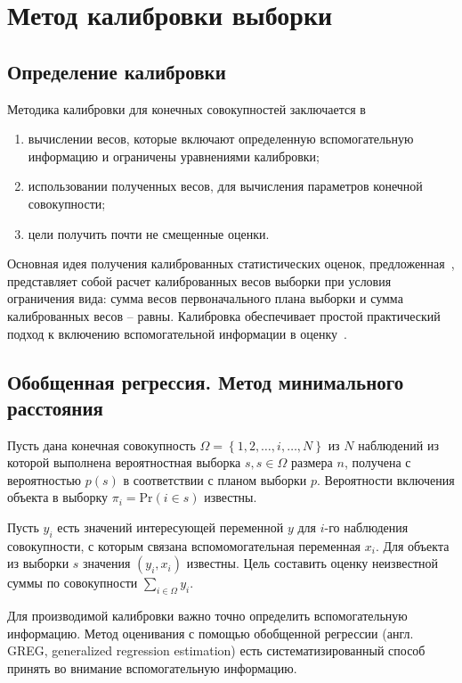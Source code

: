 \section{Метод калибровки выборки}
\subsection{Определение калибровки}

Методика калибровки для конечных совокупностей \autocite{ps:summary} заключается в
\begin{enumerate}
    \item вычислении весов, которые включают определенную вспомогательную информацию и ограничены уравнениями калибровки;
    \item использовании полученных весов, для вычисления параметров конечной совокупности;
    \item цели получить почти не смещенные оценки.
\end{enumerate}

Основная идея получения калиброванных статистических оценок, предложенная~\autocite{ps:calibration}, представляет собой
расчет калиброванных весов выборки при условия ограничения вида: сумма весов первоначального плана выборки и сумма
калиброванных весов -- равны. Калибровка обеспечивает простой практический подход к включению вспомогательной информации
в оценку~\autocite{ps:estimation}.

\subsection{Обобщенная регрессия. Метод минимального расстояния}

Пусть дана конечная совокупность $\Omega = \left\{1, 2, \dots, i, \dots, N \right\}$ из $N$ наблюдений из которой выполнена
вероятностная выборка $s, s\in\Omega$ размера $n$, получена с вероятностью $p(s)$ в соответствии с планом выборки $p$.
Вероятности включения объекта в выборку  $\pi_i = \text{Pr}\left( i \in s\right)$ известны.

Пусть $y_i$ есть значений интересующей переменной $y$ для $i$-го наблюдения совокупности, с которым связана 
вспомомогательная переменная $x_i$. Для объекта из выборки $s$ значения $\left(y_i, x_i\right)$ известны. Цель составить
оценку неизвестной суммы по совокупности $\sum\limits_{i \in \Omega} y_i$. 

Для производимой калибровки важно точно определить вспомогательную информацию. Метод оценивания с помощью обобщенной
регрессии (англ. GREG, generalized regression estimation) есть систематизированный способ принять во внимание
вспомогательную информацию.


